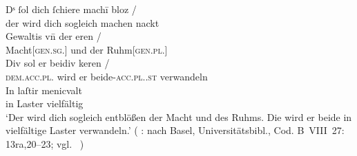 \begin{exe}
\ex \label{ex:beid2p2combrem}
		\gll Dˢ ſol dich ſchiere machī bloz {/} \\
			der wird dich sogleich machen nackt \\
		\gll Gewaltis vn̄ der eren {/} \\
			Macht[\textsc{gen.sg.\FemI}] und der Ruhm[\textsc{gen.pl.\FemI}] \\
		\gll Div sol er beidiv keren {/} \\
			\textsc{dem.acc.pl.\NeutI} wird er beide-\textsc{acc.pl.\NeutI.st}
			verwandeln \\
		\gll In laſtir menicvalt \\
			in Laster vielfältig \\
		\trans `Der wird dich sogleich entblößen der Macht und des Ruhms.
			Die wird er beide in vielfältige Laster verwandeln.'
			(%
				: 
				nach Basel, Universitätsbibl., Cod. B~VIII~27: 13ra,20--23;
				vgl.~\cites[M317]{rem}%
			)

	
\end{exe}
